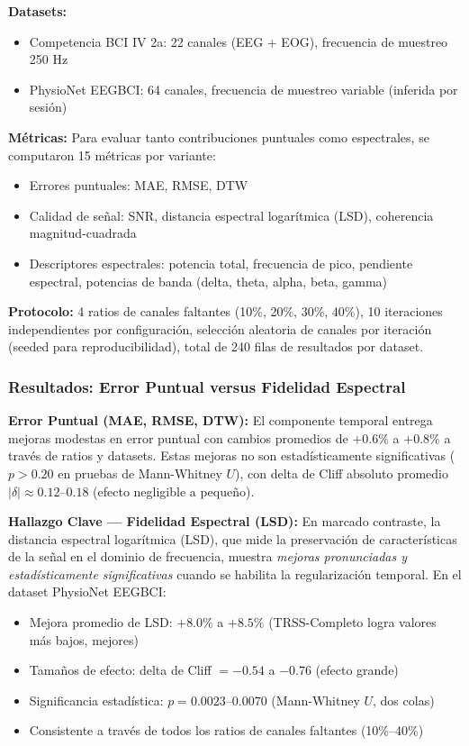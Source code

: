 \textbf{Datasets:}
\begin{itemize}
  \item Competencia BCI IV 2a: 22 canales (EEG + EOG), frecuencia de muestreo 250 Hz
  \item PhysioNet EEGBCI: 64 canales, frecuencia de muestreo variable (inferida por sesión)
\end{itemize}

\textbf{Métricas:} Para evaluar tanto contribuciones puntuales como espectrales, se computaron 15 métricas por variante:
\begin{itemize}
  \item Errores puntuales: MAE, RMSE, DTW
  \item Calidad de señal: SNR, distancia espectral logarítmica (LSD), coherencia magnitud-cuadrada
  \item Descriptores espectrales: potencia total, frecuencia de pico, pendiente espectral, potencias de banda (delta, theta, alpha, beta, gamma)
\end{itemize}

\textbf{Protocolo:} 4 ratios de canales faltantes (10\%, 20\%, 30\%, 40\%), 10 iteraciones independientes por configuración, selección aleatoria de canales por iteración (seeded para reproducibilidad), total de 240 filas de resultados por dataset.

\subsubsection{Resultados: Error Puntual versus Fidelidad Espectral}

\textbf{Error Puntual (MAE, RMSE, DTW):} El componente temporal entrega mejoras modestas en error puntual con cambios promedios de $+0.6\%$ a $+0.8\%$ a través de ratios y datasets. Estas mejoras no son estadísticamente significativas ($p > 0.20$ en pruebas de Mann-Whitney $U$), con delta de Cliff absoluto promedio $|\delta| \approx 0.12$--$0.18$ (efecto negligible a pequeño).

\textbf{Hallazgo Clave --- Fidelidad Espectral (LSD):} En marcado contraste, la distancia espectral logarítmica (LSD), que mide la preservación de características de la señal en el dominio de frecuencia, muestra \textit{mejoras pronunciadas y estadísticamente significativas} cuando se habilita la regularización temporal. En el dataset PhysioNet EEGBCI:

\begin{itemize}
  \item Mejora promedio de LSD: $+8.0\%$ a $+8.5\%$ (TRSS-Completo logra valores más bajos, mejores)
  \item Tamaños de efecto: delta de Cliff $= -0.54$ a $-0.76$ (efecto grande)
  \item Significancia estadística: $p = 0.0023$--$0.0070$ (Mann-Whitney $U$, dos colas)
  \item Consistente a través de todos los ratios de canales faltantes (10\%--40\%)
\end{itemize}

